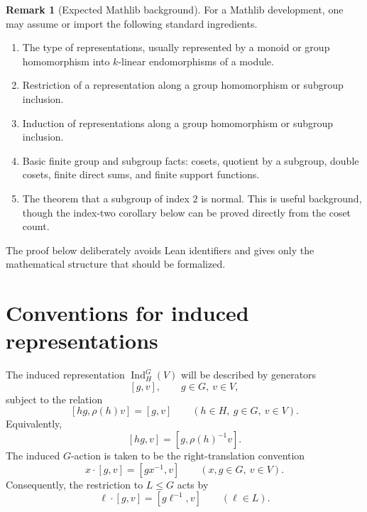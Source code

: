 \documentclass[11pt]{article}
\theoremstyle{definition}
\newtheorem{remark}[theorem]{Remark}
\newcommand{\Ind}{\operatorname{Ind}}
\begin{document}
\begin{remark}[Expected Mathlib background]
For a Mathlib development, one may assume or import the following standard ingredients.
\begin{enumerate}[label=(\alph*)]
  \item The type of representations, usually represented by a monoid or group homomorphism into $k$-linear endomorphisms of a module.
  \item Restriction of a representation along a group homomorphism or subgroup inclusion.
  \item Induction of representations along a group homomorphism or subgroup inclusion.
  \item Basic finite group and subgroup facts: cosets, quotient by a subgroup, double cosets, finite direct sums, and finite support functions.
  \item The theorem that a subgroup of index $2$ is normal. This is useful background, though the index-two corollary below can be proved directly from the coset count.
\end{enumerate}
The proof below deliberately avoids Lean identifiers and gives only the mathematical structure that should be formalized.
\end{remark}

\section{Conventions for induced representations}

The induced representation $\Ind_H^G(V)$ will be described by generators
\[
  [g,v], \qquad g\in G,\ v\in V,
\]
subject to the relation
\begin{equation}\label{eq:ind-relation}
  [hg,\rho(h)v] = [g,v]
  \qquad (h\in H,\ g\in G,\ v\in V).
\end{equation}
Equivalently,
\begin{equation}\label{eq:ind-relation-inverse}
  [hg,v] = [g,\rho(h)^{-1}v].
\end{equation}
The induced $G$-action is taken to be the right-translation convention
\begin{equation}\label{eq:G-action}
  x\cdot[g,v] = [gx^{-1},v]
  \qquad (x,g\in G,\ v\in V).
\end{equation}
Consequently, the restriction to $L\leq G$ acts by
\begin{equation}\label{eq:L-action-restricted}
  \ell\cdot[g,v]=[g\ell^{-1},v]
  \qquad (\ell\in L).
\end{equation}
\end{document}
